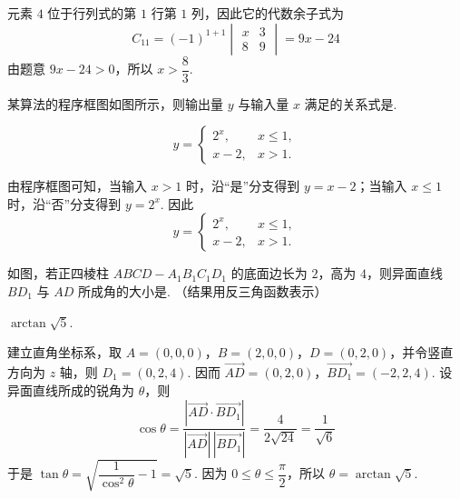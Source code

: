 \begin{solution}
元素 \(4\) 位于行列式的第 \(1\) 行第 \(1\) 列，因此它的代数余子式为
\[
C_{11}=(-1)^{1+1}\begin{vmatrix}x&3\\8&9\end{vmatrix}=9x-24
\]
由题意 \(9x-24>0\)，所以 \(x>\dfrac{8}{3}\).
\end{solution}

\begin{problem}
某算法的程序框图如图所示，则输出量 \(y\) 与输入量 \(x\) 满足的关系式是\fillinblank{}.

\end{problem}

\begin{answer}
\[
y=\begin{cases}
2^x,&x\leqslant 1,\\
x-2,&x>1.
\end{cases}
\]
\end{answer}

\begin{solution}
由程序框图可知，当输入 \(x>1\) 时，沿“是”分支得到 \(y=x-2\)；当输入 \(x\leqslant 1\) 时，沿“否”分支得到 \(y=2^x\). 因此
\[
y=\begin{cases}
2^x,&x\leqslant 1,\\
x-2,&x>1.
\end{cases}
\]
\end{solution}

\begin{problem}
如图，若正四棱柱 \(ABCD - A_1B_1C_1D_1\) 的底面边长为 \(2\)，高为 \(4\)，则异面直线 \(BD_1\) 与 \(AD\) 所成角的大小是\fillinblank{}. （结果用反三角函数表示）

\end{problem}

\begin{answer}
\(\arctan\sqrt{5}\).
\end{answer}

\begin{solution}
建立直角坐标系，取 \(A=(0,0,0)\)，\(B=(2,0,0)\)，\(D=(0,2,0)\)，并令竖直方向为 \(z\) 轴，则 \(D_1=(0,2,4)\). 因而
\(\overrightarrow{AD}=(0,2,0)\)，\(\overrightarrow{BD_1}=(-2,2,4)\).
设异面直线所成的锐角为 \(\theta\)，则
\[
\cos\theta=\frac{\left|\overrightarrow{AD}\cdot\overrightarrow{BD_1}\right|}{|\overrightarrow{AD}|\,|\overrightarrow{BD_1}|}=\frac{4}{2\sqrt{24}}=\frac{1}{\sqrt{6}}
\]
于是 \(\tan\theta=\sqrt{\dfrac{1}{\cos^2\theta}-1}=\sqrt{5}\). 因为 \(0\leqslant\theta\leqslant\dfrac{\pi}{2}\)，所以 \(\theta=\arctan\sqrt{5}\).
\end{solution}

